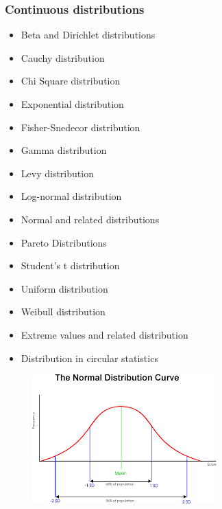 \documentclass[MAIN.tex]{subfiles}
\begin{document}
\begin{frame}
\frametitle{Continuous distributions}
\begin{itemize}
\item Beta and Dirichlet distributions
\item Cauchy distribution
\item Chi Square distribution
\item Exponential distribution
\item Fisher-Snedecor distribution
\item Gamma distribution
\item Levy distribution
\item Log-normal distribution
\item Normal and related distributions
\item Pareto Distributions
\item Student's t distribution
\item Uniform distribution
\item Weibull distribution
\item Extreme values and related distribution
\item Distribution in circular statistics
\end{itemize}
\end{frame}
\begin{frame}
	\begin{figure}
		\centering
		\includegraphics[width=0.9\linewidth]{images/bellcurve}
	\end{figure}

\end{frame}
\end{document}
